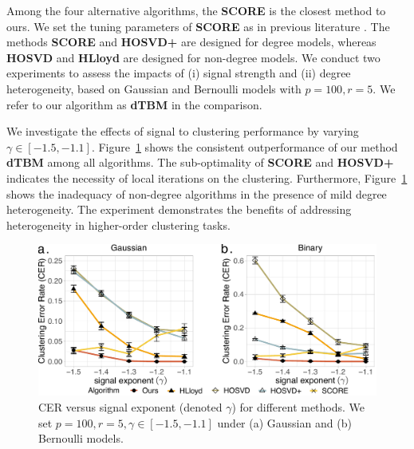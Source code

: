\documentclass[lettersize,onecolumn,journal]{IEEEtran}
\theoremstyle{definition}
\theoremstyle{definition}
\begin{document}
Among the four alternative algorithms, the \textbf{\small SCORE} is the closest method to ours. We set the tuning parameters of \textbf{\small SCORE} as in previous literature \citep{ke2019community}. The methods \textbf{\small SCORE} and \textbf{\small HOSVD+} are designed for degree models, whereas \textbf{\small HOSVD} and \textbf{\small HLloyd} are designed for non-degree models. We conduct two experiments to assess the impacts of (i) signal strength and (ii) degree heterogeneity, based on Gaussian and Bernoulli models with $ p = 100, r = 5$. We refer to our algorithm as \textbf{\small dTBM} in the comparison. 

We investigate the effects of signal to clustering performance by varying $\gamma \in [-1.5, -1.1]$. Figure~\ref{fig:comp_gamma} shows the consistent outperformance of our method \textbf{\small dTBM} among all algorithms. The sub-optimality of \textbf{\small SCORE} and \textbf{\small HOSVD+} indicates the necessity of local iterations on the clustering. Furthermore,  Figure~\ref{fig:comp_gamma} shows the inadequacy of non-degree algorithms in the presence of mild degree heterogeneity. 
The experiment demonstrates the benefits of addressing heterogeneity in higher-order clustering tasks.   


\begin{figure}[h!]
    \centering
    \includegraphics[width=.8\columnwidth]{comp_gamma_anno3.pdf}
    \caption{CER versus signal exponent (denoted $\gamma$) for different methods. We set $p = 100, r = 5, \gamma \in [-1.5, -1.1]$ under (a) Gaussian and (b) Bernoulli models.}
    \label{fig:comp_gamma}
\end{figure}
\end{document}

